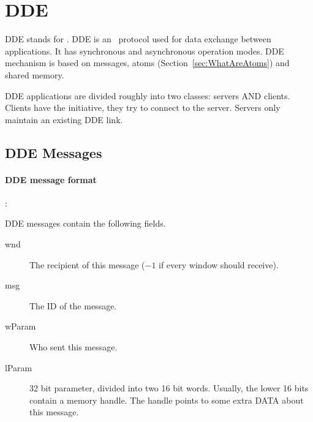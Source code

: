 \section{DDE}
\label{sec:DDE}
DDE stands for \DDE\@. DDE is an \windoz\ 
protocol used for data exchange between applications.
It has synchronous and asynchronous operation modes.
DDE mechanism is based on messages, atoms
(Section~\ref{sec:WhatAreAtoms}) and shared memory.

DDE applications are divided roughly into two classes: servers AND
clients. Clients have the initiative, they try to connect to the
server. Servers only maintain an existing DDE link.


\subsection{DDE Messages}
\paragraph{DDE message format}:

\label{sec:DDEMessageFormat}

DDE messages contain the following fields.
\begin{description}
  \item[wnd] The recipient of this message ($-1$ if every window
    should receive).
  \item[msg]    The ID of the message.
  \item[wParam] Who sent this message.
  \item[lParam] 32 bit parameter, divided into two 16 bit words.
    Usually, the lower 16 bits contain a memory handle. The handle
    points to some extra DATA about this message.
    
\end{description}

